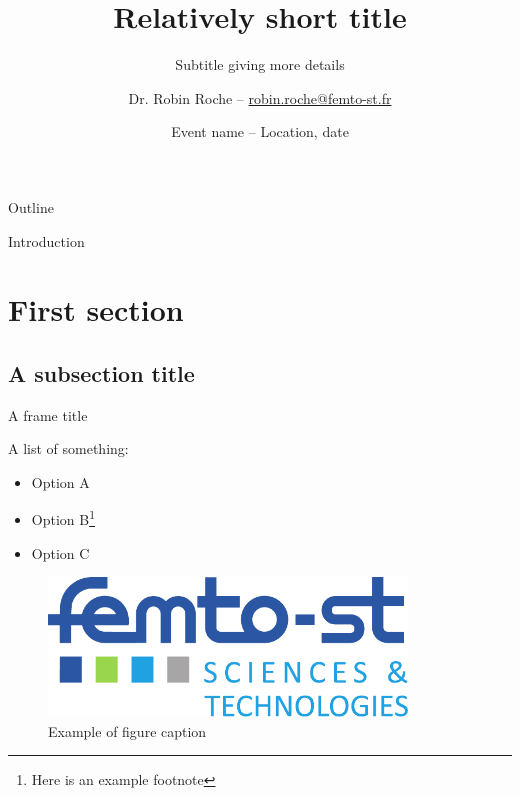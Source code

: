 \documentclass[9pt,handout]{beamer} %
\title{Relatively short title}
\subtitle{Subtitle giving more details}
\author{Dr. Robin Roche \texorpdfstring{-- \url{robin.roche@femto-st.fr}}{}}
\institute{FEMTO-ST, FCLAB, CNRS, Univ. Bourgogne Franche-Comte, UTBM}
\date{Event name -- Location, date}
\begin{document}


\begin{frame}[plain]
\titlepage
\end{frame}
 


\begin{frame}{Outline}
	\tableofcontents[pausesections,subsectionstyle=hide]
\end{frame}


\begin{frame}{Introduction}

\lipsum[1-2]

\end{frame}


\section{First section}


\subsection{A subsection title}


\begin{frame}{A frame title}

A list of something:
\begin{itemize}
\item Option A
\item Option B\footnote{Here is an example footnote}
\item Option C
\end{itemize}

\vspace*{1em}
\begin{figure}[hbtp]
\centering
\includegraphics[height=10em]{figures/logo_FEMTO-ST.pdf}
\caption{Example of figure caption}
\end{figure}

\end{frame}
\end{document}
